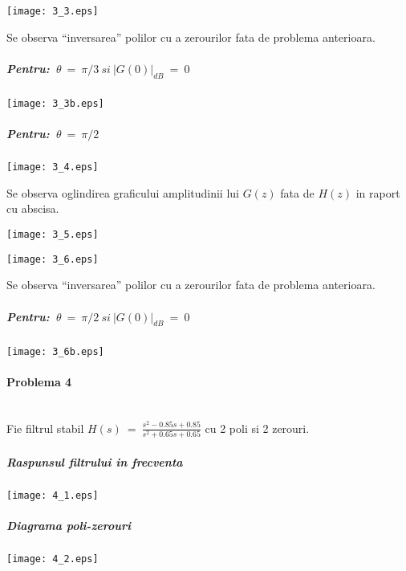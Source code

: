 \documentclass[12pt,english]{article}
\newcommand{\myparagraph}[1]{\paragraph{#1}\mbox{}\\}
\begin{document}
\begin{center}
\texttt{[image: 3\_3.eps]}
\end{center}

Se observa ``inversarea'' polilor cu a zerourilor fata de problema anterioara.	

\subparagraph {Pentru:\ $\displaystyle \theta \ =\ \pi /3 \ si \ | G( 0)| _{dB} \ =\ 0$}

\begin{center}
\texttt{[image: 3\_3b.eps]}
\end{center}

\pagebreak
\subparagraph {Pentru:\ $\displaystyle \theta \ =\ \pi /2$}

\begin{center}
\texttt{[image: 3\_4.eps]}
\end{center}

Se observa oglindirea graficului amplitudinii lui $G(z)$ fata de $H(z)$ in raport cu abscisa.

\begin{center}
\texttt{[image: 3\_5.eps]}
\end{center}

\begin{center}
\texttt{[image: 3\_6.eps]}
\end{center}

Se observa ``inversarea'' polilor cu a zerourilor fata de problema anterioara.	

\subparagraph {Pentru:\ $\displaystyle \theta \ =\ \pi /2 \ si \ | G( 0)| _{dB} \ =\ 0$}

\begin{center}
\texttt{[image: 3\_6b.eps]}
\end{center}


\pagebreak
\myparagraph {Problema 4}

{Fie filtrul stabil $\displaystyle H( s) \ =\ \frac{s^{2} -0.85s+0.85}{s^{2} +0.65s+0.65}$ cu 2 poli si 2 zerouri.}

\subparagraph {Raspunsul filtrului in frecventa}
\begin{center}
\texttt{[image: 4\_1.eps]}
\end{center}

\subparagraph {Diagrama poli-zerouri}
\begin{center}
\texttt{[image: 4\_2.eps]}
\end{center}
\end{document}
